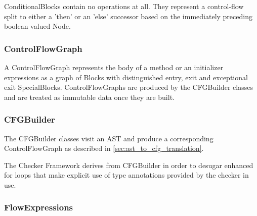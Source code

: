 

    ConditionalBlocks contain no operations at all.  They represent a control-flow split to either a 'then' or an 'else' successor based on the immediately preceding boolean valued Node.

    
    


\subsubsection{ControlFlowGraph}
\label{sec:control_flow_graph_class}

     A ControlFlowGraph represents the body of a method or an initializer expressions as a graph of Blocks with distinguished entry, exit and exceptional exit SpecialBlocks.  ControlFlowGraphs are produced by the CFGBuilder classes and are treated as immutable data once they are built.


\subsubsection{CFGBuilder}
\label{sec:cfg_builder_classes}
    
    The CFGBuilder classes visit an AST and produce a corresponding ControlFlowGraph as described in \autoref{sec:ast_to_cfg_translation}.
    
        
    The Checker Framework derives from CFGBuilder in order to desugar enhanced for loops that make explicit use of type annotations provided by the checker in use.
        


\subsubsection{FlowExpressions}
\label{sec:flow_expressions_class}

